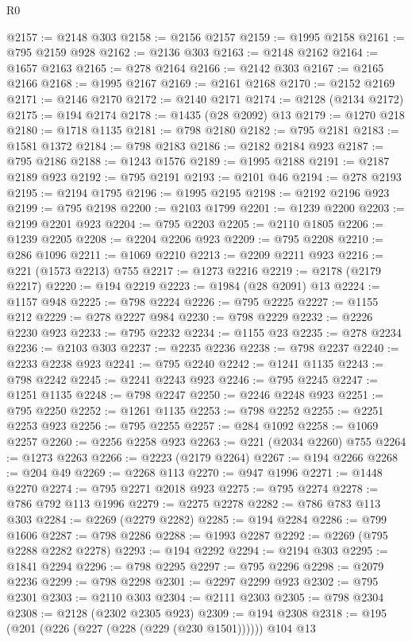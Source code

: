 \begin{lexlean}{R0}
\begin{coremodule}
@2157 := @2148 @303
@2158 := @2156 @2157
@2159 := @1995 @2158
@2161 := @795 @2159 @928
@2162 := @2136 @303
@2163 := @2148 @2162
@2164 := @1657 @2163
@2165 := @278 @2164
@2166 := @2142 @303
@2167 := @2165 @2166
@2168 := @1995 @2167
@2169 := @2161 @2168
@2170 := @2152 @2169
@2171 := @2146 @2170
@2172 := @2140 @2171
@2174 := @2128 (@2134 @2172)
@2175 := @194 @2174
@2178 := @1435 (@28 @2092) @13
@2179 := @1270 @218
@2180 := @1718 @1135
@2181 := @798 @2180
@2182 := @795 @2181
@2183 := @1581 @1372
@2184 := @798 @2183
@2186 := @2182 @2184 @923
@2187 := @795 @2186
@2188 := @1243 @1576
@2189 := @1995 @2188
@2191 := @2187 @2189 @923
@2192 := @795 @2191
@2193 := @2101 @46
@2194 := @278 @2193
@2195 := @2194 @1795
@2196 := @1995 @2195
@2198 := @2192 @2196 @923
@2199 := @795 @2198
@2200 := @2103 @1799
@2201 := @1239 @2200
@2203 := @2199 @2201 @923
@2204 := @795 @2203
@2205 := @2110 @1805
@2206 := @1239 @2205
@2208 := @2204 @2206 @923
@2209 := @795 @2208
@2210 := @286 @1096
@2211 := @1069 @2210
@2213 := @2209 @2211 @923
@2216 := @221 (@1573 @2213) @755
@2217 := @1273 @2216
@2219 := @2178 (@2179 @2217)
@2220 := @194 @2219
@2223 := @1984 (@28 @2091) @13
@2224 := @1157 @948
@2225 := @798 @2224
@2226 := @795 @2225
@2227 := @1155 @212
@2229 := @278 @2227 @984
@2230 := @798 @2229
@2232 := @2226 @2230 @923
@2233 := @795 @2232
@2234 := @1155 @23
@2235 := @278 @2234
@2236 := @2103 @303
@2237 := @2235 @2236
@2238 := @798 @2237
@2240 := @2233 @2238 @923
@2241 := @795 @2240
@2242 := @1241 @1135
@2243 := @798 @2242
@2245 := @2241 @2243 @923
@2246 := @795 @2245
@2247 := @1251 @1135
@2248 := @798 @2247
@2250 := @2246 @2248 @923
@2251 := @795 @2250
@2252 := @1261 @1135
@2253 := @798 @2252
@2255 := @2251 @2253 @923
@2256 := @795 @2255
@2257 := @284 @1092
@2258 := @1069 @2257
@2260 := @2256 @2258 @923
@2263 := @221 (@2034 @2260) @755
@2264 := @1273 @2263
@2266 := @2223 (@2179 @2264)
@2267 := @194 @2266
@2268 := @204 @49
@2269 := @2268 @113
@2270 := @947 @1996
@2271 := @1448 @2270
@2274 := @795 @2271 @2018 @923
@2275 := @795 @2274
@2278 := @786 @792 @113 @1996
@2279 := @2275 @2278
@2282 := @786 @783 @113 @303
@2284 := @2269 (@2279 @2282)
@2285 := @194 @2284
@2286 := @799 @1606
@2287 := @798 @2286
@2288 := @1993 @2287
@2292 := @2269 (@795 @2288 @2282 @2278)
@2293 := @194 @2292
@2294 := @2194 @303
@2295 := @1841 @2294
@2296 := @798 @2295
@2297 := @795 @2296
@2298 := @2079 @2236
@2299 := @798 @2298
@2301 := @2297 @2299 @923
@2302 := @795 @2301
@2303 := @2110 @303
@2304 := @2111 @2303
@2305 := @798 @2304
@2308 := @2128 (@2302 @2305 @923)
@2309 := @194 @2308
@2318 := @195 (@201 (@226 (@227 (@228 (@229 (@230 @1501)))))) @104 @13

\end{coremodule}
\end{lexlean}
